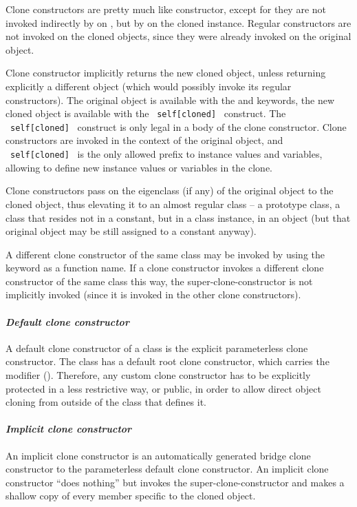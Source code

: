 Clone constructors are pretty much like constructor, except for they are not invoked indirectly by  on , but by  on the cloned instance. Regular constructors are not invoked on the cloned objects, since they were already invoked on the original object. 

Clone constructor implicitly returns the new cloned object, unless returning explicitly a different object (which would possibly invoke its regular constructors). The original object is available with the  and  keywords, the new cloned object is available with the ~\lstinline!self[cloned]!~ construct. The ~\lstinline!self[cloned]!~ construct is only legal in a body of the clone constructor. Clone constructors are invoked in the context of the original object, and ~\lstinline!self[cloned]!~ is the only allowed prefix to instance values and variables, allowing to define new instance values or variables in the clone. 

Clone constructors pass on the eigenclass (if any) of the original object to the cloned object, thus elevating it to an almost regular class -- a prototype class, a class that resides not in a constant, but in a class instance, in an object (but that original object may be still assigned to a constant anyway). 

A different clone constructor of the same class may be invoked by using the  keyword as a function name. If a clone constructor invokes a different clone constructor of the same class this way, the super-clone-constructor is not implicitly invoked (since it is invoked in the other clone constructors). 

\paragraph{\em Default clone constructor}
A default clone constructor of a class is the explicit parameterless clone constructor. The  class has a default root clone constructor, which carries the modifier  (). Therefore, any custom clone constructor has to be explicitly protected in a less restrictive way, or public, in order to allow direct object cloning from outside of the class that defines it. 

\paragraph{\em Implicit clone constructor}
An implicit clone constructor is an automatically generated bridge clone constructor to the parameterless default clone constructor. An implicit clone constructor ``does nothing'' but invokes the super-clone-constructor and makes a shallow copy of every member specific to the cloned object. 

